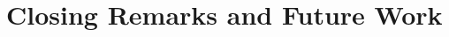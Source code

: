 \documentclass[reqno,12pt,oneside]{report} %
\begin{document}
%     


%     
    
%     
    
%     
    
\cleardoublepage
  \chapter{Closing Remarks and Future Work}
  \label{chap:conc}
  






%
% 
\end{document}
